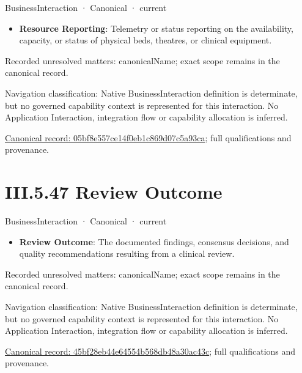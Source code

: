 \label{element:05bf8e557ce14f0eb1c869d07c5a93ca}
{\small BusinessInteraction · Canonical · current}\par

\begin{itemize}


\item \textbf{Resource Reporting}: Telemetry or status reporting on the availability, capacity, or status of physical beds, theatres, or clinical equipment.

\end{itemize}

{\small Recorded unresolved matters: canonicalName; exact scope remains in the canonical record.}\par
{\small Navigation classification: Native BusinessInteraction definition is determinate, but no governed capability context is represented for this interaction. No Application Interaction, integration flow or capability allocation is inferred.}\par
{\footnotesize \href{../../../../continuum/business/business-interaction/05bf8e557ce14f0eb1c869d07c5a93ca.md}{Canonical record: 05bf8e557ce14f0eb1c869d07c5a93ca}; full qualifications and provenance.}\par
\section*{III.5.47 Review Outcome}
\label{navigation:III.5.47}

\label{element:45bf28eb44e64554b568db48a30ac43c}
{\small BusinessInteraction · Canonical · current}\par

\begin{itemize}


\item \textbf{Review Outcome}: The documented findings, consensus decisions, and quality recommendations resulting from a clinical review.

\end{itemize}

{\small Recorded unresolved matters: canonicalName; exact scope remains in the canonical record.}\par
{\small Navigation classification: Native BusinessInteraction definition is determinate, but no governed capability context is represented for this interaction. No Application Interaction, integration flow or capability allocation is inferred.}\par
{\footnotesize \href{../../../../continuum/business/business-interaction/45bf28eb44e64554b568db48a30ac43c.md}{Canonical record: 45bf28eb44e64554b568db48a30ac43c}; full qualifications and provenance.}\par
